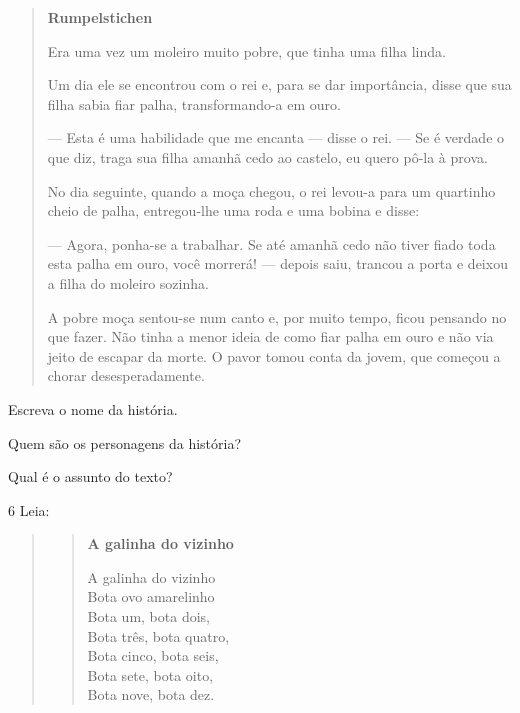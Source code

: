 \begin{quote}
\textbf{Rumpelstichen}

Era uma vez um moleiro muito pobre, que tinha uma filha linda.

Um dia ele se encontrou com o rei e, para se dar importância,
disse que sua filha sabia fiar palha, transformando-a em ouro.

--- Esta é uma habilidade que me encanta --- disse o
rei. --- Se é verdade o que diz, traga sua filha amanhã cedo ao
castelo, eu quero pô-la à prova.

No dia seguinte, quando a moça chegou, o rei levou-a
para um quartinho cheio de palha, entregou-lhe uma roda e uma
bobina e disse:

--- Agora, ponha-se a trabalhar. Se até amanhã cedo
não tiver fiado toda esta palha em ouro, você morrerá! ---
depois saiu, trancou a porta e deixou a filha do moleiro
sozinha.

A pobre moça sentou-se num canto e, por muito tempo,
ficou pensando no que fazer. Não tinha a menor ideia de como
fiar palha em ouro e não via jeito de escapar da morte. O
pavor tomou conta da jovem, que começou a chorar
desesperadamente.

\end{quote}

\begin{escolha}
\item Escreva o nome da história.


\item Quem são os personagens da história?


\item Qual é o assunto do texto?

\end{escolha}

\num{6} Leia:

\begin{quote}
\begin{verse}
\textbf{A galinha do vizinho}

A galinha do vizinho\\
Bota ovo amarelinho\\
Bota um, bota dois,\\
Bota três, bota quatro,\\
Bota cinco, bota seis,\\
Bota sete, bota oito,\\
Bota nove, bota dez.
\end{verse}
\end{quote}

